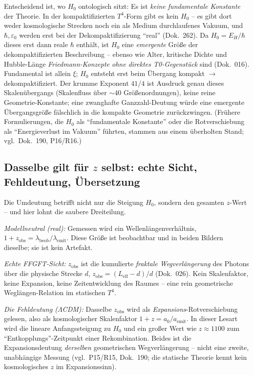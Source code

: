Entscheidend ist, wo $H_0$ ontologisch sitzt: Es ist \emph{keine fundamentale
Konstante} der Theorie. In der kompaktifizierten $T^4$-Form gibt es kein
$H_0$ -- es gibt dort weder kosmologische Strecken noch ein als Medium
durchlaufenes Vakuum, und $\hbar, \varepsilon_0$ werden erst bei der
Dekompaktifizierung \enquote{real} (Dok.~262). Da $H_0 = E_H/\hbar$ dieses
erst dann reale $\hbar$ enthält, ist $H_0$ eine \emph{emergente} Größe der
dekompaktifizierten Beschreibung -- ebenso wie Alter, kritische Dichte und
Hubble-Länge \emph{Friedmann-Konzepte ohne direktes T0-Gegenstück} sind
(Dok.~016). Fundamental ist allein $\xi$; $H_0$ entsteht erst beim Übergang
kompakt $\to$ dekompaktifiziert. Der krumme Exponent $41/4$ ist Ausdruck
genau dieses Skalenübergangs (Skalenfluss über $\sim 40$ Größenordnungen),
keine reine Geometrie-Konstante; eine zwanghafte Ganzzahl-Deutung würde eine
emergente Übergangsgröße fälschlich in die kompakte Geometrie zurückzwingen.
(Frühere Formulierungen, die $H_0$ als \enquote{fundamentale Konstante} oder
die Rotverschiebung als \enquote{Energieverlust im Vakuum} führten, stammen
aus einem überholten Stand; vgl.\ Dok.~190, P16/R16.)

\subsection*{Dasselbe gilt für $z$ selbst: echte Sicht, Fehldeutung, Übersetzung}

Die Umdeutung betrifft nicht nur die Steigung $H_0$, sondern den gesamten
$z$-Wert -- und hier lohnt die saubere Dreiteilung.

\emph{Modellneutral (real):} Gemessen wird ein Wellenlängenverhältnis,
$1+z_{\text{obs}} = \lambda_{\text{beob}}/\lambda_{\text{emit}}$. Diese Größe
ist beobachtbar und in beiden Bildern dieselbe; sie ist kein Artefakt.

\emph{Echte FFGFT-Sicht:} $z_{\text{obs}}$ ist die kumulierte \emph{fraktale
Wegverlängerung} des Photons über die physische Strecke $d$,
$z_{\text{obs}} = (L_{\text{eff}}-d)/d$ (Dok.~026). Kein Skalenfaktor, keine
Expansion, keine Zeitentwicklung des Raumes -- eine rein geometrische
Weglängen-Relation im statischen $T^4$.

\emph{Die Fehldeutung ($\Lambda$CDM):} Dasselbe $z_{\text{obs}}$ wird als
\emph{Expansions}-Rotverschiebung gelesen, also als kosmologischer Skalenfaktor
$1+z = a_0/a_{\text{emit}}$. In dieser Lesart wird die lineare Anfangssteigung
zu $H_0$ und ein großer Wert wie $z\approx 1100$ zum \enquote{Entkopplungs}-Zeitpunkt
einer Rekombination. Beides ist die Expansionsdeutung \emph{derselben}
geometrischen Wegverlängerung -- nicht eine zweite, unabhängige Messung
(vgl.\ P15/R15, Dok.~190; die statische Theorie kennt kein kosmologisches $z$
im Expansionssinn).

